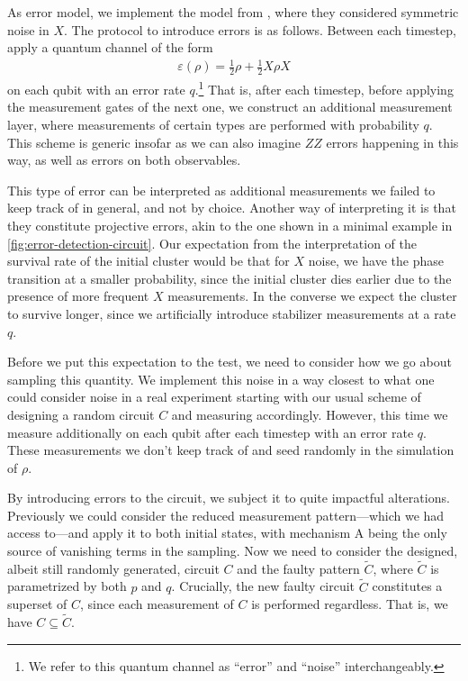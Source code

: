 As error model, we implement the model from
\cite{tikhanovskayaUniversalityCrossEntropy2023}, where they
considered symmetric noise in $X$. The protocol to introduce errors is as
follows. Between each timestep, apply a quantum channel of the form
\begin{align}\label{eq:noisechannel}
  \varepsilon(\rho) = \frac{1}{2}\rho + \frac{1}{2}X\rho X
\end{align}
on each qubit with an error rate $q$.\footnote{We refer to this quantum channel
as \enquote{error} and \enquote{noise} interchangeably.} That is, after each timestep, before
applying the measurement gates of the next one, we construct an additional
measurement layer, where measurements of certain types are performed with
probability $q$.  This scheme is generic insofar as we can also imagine $ZZ$
errors happening in this way, as well as errors on both observables.

This type of error can be interpreted as additional measurements we failed to
keep track of in general, and not by choice. Another way of interpreting it is
that they constitute projective errors, akin to the one shown in a minimal
example in \cref{fig:error-detection-circuit}. Our expectation from the
interpretation of the survival rate of the initial cluster would be that for
$X$ noise, we have the phase transition at a smaller probability, since the
initial cluster dies earlier due to the presence of more frequent $X$
measurements. In the converse we expect the cluster to survive longer, since we
artificially introduce stabilizer measurements at a rate $q$.

Before we put this expectation to the test, we need to consider how we go about
sampling this quantity. We implement this noise in a way closest to what one
could consider noise in a real experiment starting with our usual scheme of
designing a random circuit $C$ and measuring accordingly. However, this time we
measure additionally on each qubit after each timestep with an error rate $q$.
These measurements we don't keep track of and seed randomly in the simulation
of $\rho$.

By introducing errors to the circuit, we subject it to quite impactful
alterations. Previously we could consider the reduced measurement
pattern---which we had access to---and apply it to both initial states, with
mechanism \textsf{A} being the only source of vanishing terms in the sampling.
Now we need to consider the designed, albeit still randomly generated, circuit $C$
and the faulty pattern $\tilde{C}$, where $\tilde{C}$ is parametrized by both
$p$ and $q$. Crucially, the new faulty circuit $\tilde{C}$ constitutes a
superset of $C$, since each measurement of $C$ is performed regardless. That
is, we have $C\subseteq\tilde{C}$. 

